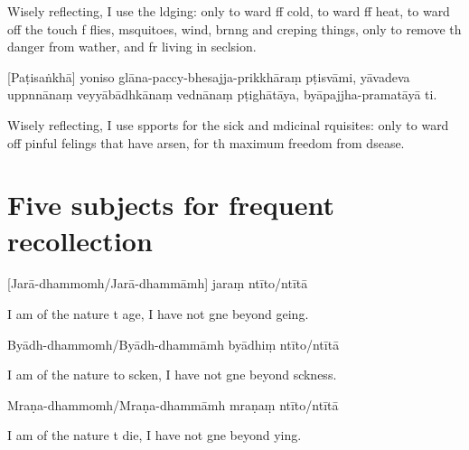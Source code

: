 \begin{english}
  Wisely reflecting, I use the ldging: only to ward ff cold, to ward ff heat, to ward off the touch f flies, msquitoes, wind, brnng and creping things, only to remove th danger from wather, and fr living in seclsion.
\end{english}

[Paṭisaṅkhā] yoniso glāna-paccy-bhesajja-prikkhāraṃ pṭisvāmi, yāvadeva uppnnānaṃ veyyābādhkānaṃ vednānaṃ pṭighātāya, byāpajjha-pramatāyā ti.

\begin{english}
  Wisely reflecting, I use spports for the sick and mdicinal rquisites: only to ward off pinful felings that have arsen, for th maximum freedom from dsease.
\end{english}

\clearpage

\chapter[Five subjects]{Five subjects for frequent recollection}%


\begin{leader}
\end{leader}

[Jarā-dhammomh/Jarā-dhammāmh] jaraṃ ntīto/ntītā

\begin{english}
  I am of the nature t age, I have not gne beyond geing.
\end{english}

Byādh-dhammomh/Byādh-dhammāmh byādhiṃ ntīto/ntītā

\begin{english}
  I am of the nature to scken, I have not gne beyond sckness.
\end{english}

Mraṇa-dhammomh/Mraṇa-dhammāmh mraṇaṃ ntīto/ntītā

\begin{english}
  I am of the nature t die, I have not gne beyond ying.
\end{english}

